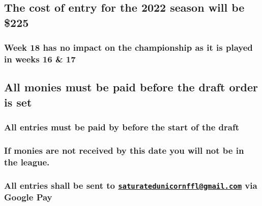 \documentclass[
]{book}
\begin{document}
\hypertarget{the-cost-of-entry-for-the-2022-season-will-be-225}{%
\subsection{The cost of entry for the 2022 season will be \$225}\label{the-cost-of-entry-for-the-2022-season-will-be-225}}

\hypertarget{week-18-has-no-impact-on-the-championship-as-it-is-played-in-weeks-16-17}{%
\subsubsection{Week 18 has no impact on the championship as it is played in weeks 16 \& 17}\label{week-18-has-no-impact-on-the-championship-as-it-is-played-in-weeks-16-17}}

\hypertarget{all-monies-must-be-paid-before-the-draft-order-is-set}{%
\subsection{All monies must be paid before the draft order is set}\label{all-monies-must-be-paid-before-the-draft-order-is-set}}

\hypertarget{all-entries-must-be-paid-by-before-the-start-of-the-draft}{%
\subsubsection{All entries must be paid by before the start of the draft}\label{all-entries-must-be-paid-by-before-the-start-of-the-draft}}

\hypertarget{if-monies-are-not-received-by-this-date-you-will-not-be-in-the-league.}{%
\subsubsection{If monies are not received by this date you will not be in the league.}\label{if-monies-are-not-received-by-this-date-you-will-not-be-in-the-league.}}

\hypertarget{all-entries-shall-be-sent-to-saturatedunicornfflgmail.com-via-google-pay}{%
\subsubsection{\texorpdfstring{All entries shall be sent to \href{mailto:saturatedunicornffl@gmail.com}{\nolinkurl{saturatedunicornffl@gmail.com}} via Google Pay}{All entries shall be sent to saturatedunicornffl@gmail.com via Google Pay}}\label{all-entries-shall-be-sent-to-saturatedunicornfflgmail.com-via-google-pay}}
\end{document}
